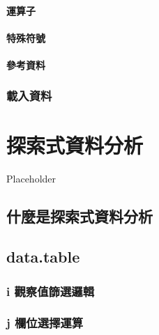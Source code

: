 \documentclass[]{book}
\begin{document}
\hypertarget{ux904bux7b97ux5b50}{%
\subsubsection{運算子}\label{ux904bux7b97ux5b50}}

\hypertarget{ux7279ux6b8aux7b26ux865f}{%
\subsubsection{特殊符號}\label{ux7279ux6b8aux7b26ux865f}}

\hypertarget{ux53c3ux8003ux8cc7ux6599}{%
\subsubsection{參考資料}\label{ux53c3ux8003ux8cc7ux6599}}

\hypertarget{ux8f09ux5165ux8cc7ux6599}{%
\subsection{載入資料}\label{ux8f09ux5165ux8cc7ux6599}}

\hypertarget{eda}{%
\chapter{探索式資料分析}\label{eda}}

Placeholder

\hypertarget{ux4ec0ux9ebcux662fux63a2ux7d22ux5f0fux8cc7ux6599ux5206ux6790}{%
\section{什麼是探索式資料分析}\label{ux4ec0ux9ebcux662fux63a2ux7d22ux5f0fux8cc7ux6599ux5206ux6790}}

\hypertarget{datatable}{%
\section{data.table}\label{datatable}}

\hypertarget{i-ux89c0ux5bdfux503cux7be9ux9078ux908fux8f2f}{%
\subsection{i 觀察值篩選邏輯}\label{i-ux89c0ux5bdfux503cux7be9ux9078ux908fux8f2f}}

\hypertarget{j-ux6b04ux4f4dux9078ux64c7ux904bux7b97}{%
\subsection{j 欄位選擇運算}\label{j-ux6b04ux4f4dux9078ux64c7ux904bux7b97}}
\end{document}
